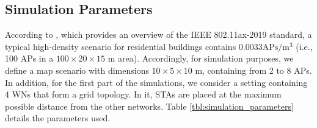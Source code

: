 \documentclass{article}
\begin{document}
	\subsection{Simulation Parameters}
	\label{section:simulation_parameters}
	According to \cite{bellalta2016ax}, which provides an overview of the IEEE 802.11ax-2019 standard, a typical high-density scenario for residential buildings contains $0.0033 \text{APs}/\text{m}^3$ (i.e., 100 APs in a $100 \times 20 \times 15$ m area). Accordingly, for simulation purposes, we define a map scenario with dimensions $10\times5\times10$ m, containing from 2 to 8 APs. In addition, for the first part of the simulations, we consider a setting containing 4 WNs that form a grid topology. In it, STAs are placed at the maximum possible distance from the other networks. Table \ref{tbl:simulation_parameters} details the parameters used.	
	\begin{table}[h!]
		\centering
		\caption{Simulation parameters}
		\label{tbl:simulation_parameters}
	\end{table}
	
\end{document}
